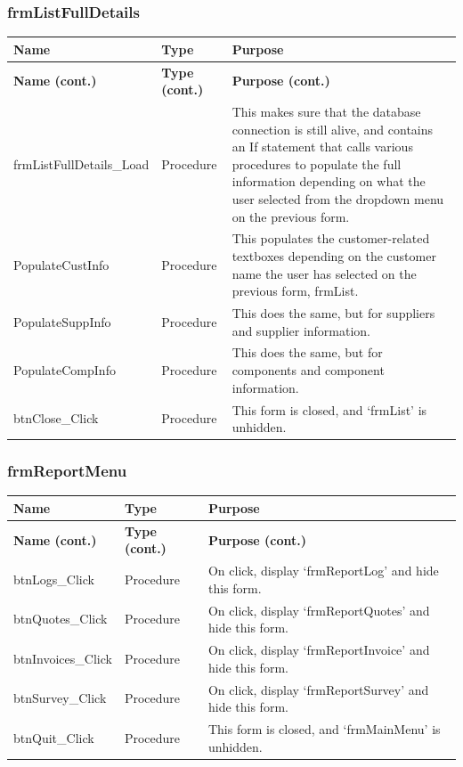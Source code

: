 	\subsubsection{frmListFullDetails}
	\begin{longtable}{ | p{4cm} | p{3cm} | p{10cm} | }
		\hline
		\textbf{Name} & \textbf{Type} & \textbf{Purpose}\\
		\endfirsthead
		\hline
		\textbf{Name (cont.)} & \textbf{Type (cont.)} & \textbf{Purpose (cont.)}\\
		\endhead
		\hline
		frmListFullDetails\_Load & Procedure & This makes sure that the database connection is still alive, and contains an If statement that calls various procedures to populate the full information depending on what the user selected from the dropdown menu on the previous form.\\
		\hline
		PopulateCustInfo & Procedure & This populates the customer-related textboxes depending on the customer name the user has selected on the previous form, frmList.\\
		\hline
		PopulateSuppInfo & Procedure & This does the same, but for suppliers and supplier information.\\
		\hline
		PopulateCompInfo & Procedure & This does the same, but for components and component information.\\
		\hline
		btnClose\_Click & Procedure & This form is closed, and `frmList' is unhidden.\\
		\hline
	\end{longtable}
	
	\subsubsection{frmReportMenu}
	\begin{longtable}{ | p{4cm} | p{3cm} | p{10cm} | }
		\hline
		\textbf{Name} & \textbf{Type} & \textbf{Purpose}\\
		\endfirsthead
		\hline
		\textbf{Name (cont.)} & \textbf{Type (cont.)} & \textbf{Purpose (cont.)}\\
		\endhead
		\hline
		btnLogs\_Click & Procedure & On click, display `frmReportLog' and hide this form.\\
		\hline
		btnQuotes\_Click & Procedure & On click, display `frmReportQuotes' and hide this form.\\
		\hline
		btnInvoices\_Click & Procedure & On click, display `frmReportInvoice' and hide this form.\\
		\hline
		btnSurvey\_Click & Procedure & On click, display `frmReportSurvey' and hide this form.\\
		\hline
		btnQuit\_Click & Procedure & This form is closed, and `frmMainMenu' is unhidden.\\
		\hline
	\end{longtable}
	
